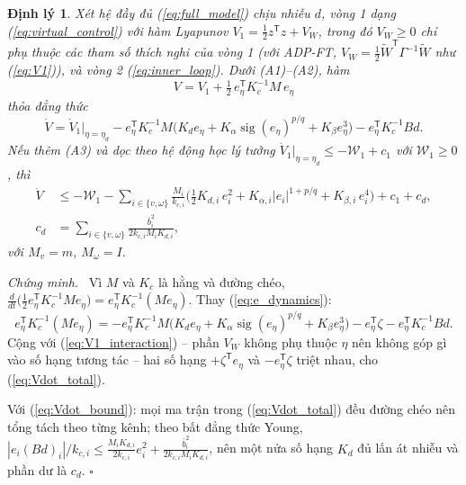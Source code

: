 \documentclass[12pt,a4paper]{article}
\newtheorem{dinhly}{Định lý}
\newenvironment{chungminh}{\par\noindent\textit{Chứng minh.}\ }{\hfill$\square$\par\medskip}
\newcommand{\T}{\mathsf{T}}
\begin{document}
\begin{dinhly}\label{thm:composite}
Xét hệ đầy đủ (\ref{eq:full_model}) chịu nhiễu $d$, vòng 1 dạng (\ref{eq:virtual_control}) với hàm Lyapunov $V_1 = \frac12 z^\T z + V_W$, trong đó $V_W \geq 0$ chỉ phụ thuộc các tham số thích nghi của vòng 1 (với ADP-FT, $V_W = \frac12\tilde W^\T\Gamma^{-1}\tilde W$ như (\ref{eq:V1})), và vòng 2 (\ref{eq:inner_loop}). Dưới (A1)--(A2), hàm
\begin{equation}\label{eq:V_total}
    V = V_1 + \tfrac12\, e_\eta^\T K_c^{-1} M\, e_\eta
\end{equation}
thỏa đẳng thức
\begin{equation}\label{eq:Vdot_total}
    \dot V = \dot V_1\big|_{\eta=\eta_d} - e_\eta^\T K_c^{-1}M\big(K_d e_\eta + K_\alpha\operatorname{sig}(e_\eta)^{p/q} + K_\beta e_\eta^3\big) - e_\eta^\T K_c^{-1} B d .
\end{equation}
Nếu thêm (A3) và dọc theo hệ động học lý tưởng $\dot V_1|_{\eta=\eta_d} \leq -\mathcal{W}_1 + c_1$ với $\mathcal{W}_1 \geq 0$, thì
\begin{equation}\label{eq:Vdot_bound}
\begin{aligned}
    \dot V &\leq -\mathcal{W}_1 - \sum_{i\in\{v,\omega\}} \frac{M_i}{k_{c,i}}\Big(\tfrac12 K_{d,i}\, e_i^2 + K_{\alpha,i}|e_i|^{1+p/q} + K_{\beta,i}\, e_i^4\Big) + c_1 + c_d, \\
    c_d &= \sum_{i\in\{v,\omega\}} \frac{\bar b_i^2}{2k_{c,i}M_i K_{d,i}},
\end{aligned}
\end{equation}
với $M_v = m$, $M_\omega = I$.
\end{dinhly}

\begin{chungminh}
Vì $M$ và $K_c$ là hằng và đường chéo, $\frac{d}{dt}\big(\frac12 e_\eta^\T K_c^{-1}Me_\eta\big) = e_\eta^\T K_c^{-1}(M\dot e_\eta)$. Thay (\ref{eq:e_dynamics}):
\[
    e_\eta^\T K_c^{-1}(M\dot e_\eta) = -e_\eta^\T K_c^{-1}M\big(K_d e_\eta + K_\alpha\operatorname{sig}(e_\eta)^{p/q} + K_\beta e_\eta^3\big) - e_\eta^\T\zeta - e_\eta^\T K_c^{-1}Bd .
\]
Cộng với (\ref{eq:V1_interaction}) -- phần $V_W$ không phụ thuộc $\eta$ nên không góp gì vào số hạng tương tác -- hai số hạng $+\zeta^\T e_\eta$ và $-e_\eta^\T\zeta$ triệt nhau, cho (\ref{eq:Vdot_total}).

Với (\ref{eq:Vdot_bound}): mọi ma trận trong (\ref{eq:Vdot_total}) đều đường chéo nên tổng tách theo từng kênh; theo bất đẳng thức Young, $|e_i (Bd)_i|/k_{c,i} \leq \frac{M_iK_{d,i}}{2k_{c,i}}e_i^2 + \frac{\bar b_i^2}{2k_{c,i}M_iK_{d,i}}$, nên một nửa số hạng $K_d$ đủ lấn át nhiễu và phần dư là $c_d$.
\end{chungminh}
\end{document}
